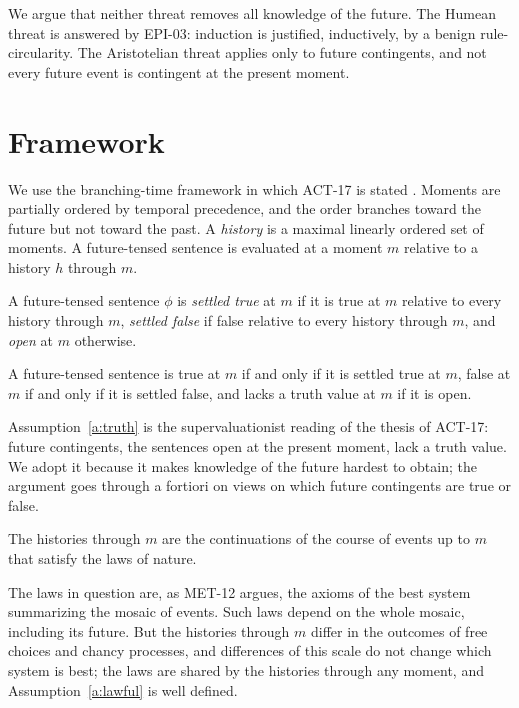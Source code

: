\documentclass{situationist-preprint}
\begin{document}
We argue that neither threat removes all knowledge of the future. The Humean threat is answered by EPI-03: induction is justified, inductively, by a benign rule-circularity. The Aristotelian threat applies only to future contingents, and not every future event is contingent at the present moment.

\section{Framework}

We use the branching-time framework in which ACT-17 is stated \citep{Belnap2001}. Moments are partially ordered by temporal precedence, and the order branches toward the future but not toward the past. A \emph{history} is a maximal linearly ordered set of moments. A future-tensed sentence is evaluated at a moment $m$ relative to a history $h$ through $m$.

\begin{definition}[Settledness]\label{d:settled}
A future-tensed sentence $\phi$ is \emph{settled true} at $m$ if it is true at $m$ relative to every history through $m$, \emph{settled false} if false relative to every history through $m$, and \emph{open} at $m$ otherwise.
\end{definition}

\begin{assumption}\label{a:truth}
A future-tensed sentence is true at $m$ if and only if it is settled true at $m$, false at $m$ if and only if it is settled false, and lacks a truth value at $m$ if it is open.
\end{assumption}

Assumption~\ref{a:truth} is the supervaluationist reading of the thesis of ACT-17: future contingents, the sentences open at the present moment, lack a truth value. We adopt it because it makes knowledge of the future hardest to obtain; the argument goes through a fortiori on views on which future contingents are true or false.

\begin{assumption}\label{a:lawful}
The histories through $m$ are the continuations of the course of events up to $m$ that satisfy the laws of nature.
\end{assumption}

The laws in question are, as MET-12 argues, the axioms of the best system summarizing the mosaic of events. Such laws depend on the whole mosaic, including its future. But the histories through $m$ differ in the outcomes of free choices and chancy processes, and differences of this scale do not change which system is best; the laws are shared by the histories through any moment, and Assumption~\ref{a:lawful} is well defined.
\end{document}
